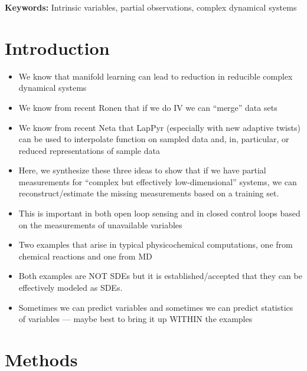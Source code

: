 \documentclass[12pt]{article}
\begin{document}
{\bf Keywords:} Intrinsic variables, partial observations, complex dynamical systems

\section{Introduction}

\begin{itemize}
    \item We know that manifold learning can lead to reduction in reducible complex dynamical systems

    \item We know from recent Ronen that if we do IV we can ``merge'' data sets

    \item We know from recent Neta that LapPyr (especially with new adaptive twists) can be used to interpolate function on sampled data and, in, particular, or reduced representations of sample data

    \item Here, we synthesize these three ideas to show that if we have partial measurements for ``complex but effectively low-dimensional'' systems, we can reconstruct/estimate the missing measurements based on a training set.

    \item This is important in both open loop sensing and in closed control loops based on the measurements of unavailable variables

    \item Two examples that arise in typical physicochemical computations, one from chemical reactions and one from MD

    \item Both examples are NOT SDEs but it is established/accepted that they can be effectively modeled as SDEs.

    \item Sometimes we can predict variables and sometimes we can predict statistics of variables --- maybe best to bring it up WITHIN the examples
\end{itemize}

\section{Methods}
\end{document}
